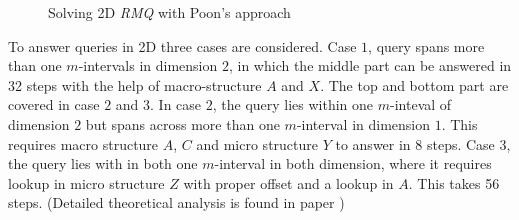 \begin{figure}[H]%
    \centering
    \qquad
    \qquad
    \caption{Solving 2D \emph{RMQ} with Poon's approach \cite{p6}}%
\end{figure}

To answer queries in 2D three cases are considered. Case $1$, query spans more than one $m$-intervals in dimension $2$, in which the middle part can be answered in 32 steps with the help of macro-structure $A$ and $X$. The top and bottom part are covered in case $2$ and $3$. In case $2$, the query lies within one $m$-inteval of dimension $2$ but spans across more than one $m$-interval in dimension $1$. This requires macro structure $A$, $C$ and micro structure $Y$ to answer in 8 steps. Case $3$, the query lies with in both one $m$-interval in both dimension, where it requires lookup in micro structure $Z$ with proper offset and a lookup in $A$. This takes 56 steps. (Detailed theoretical analysis is found in paper \cite{p6})


